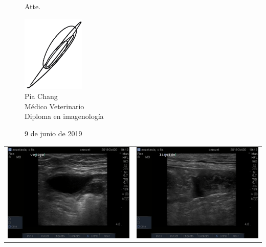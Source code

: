 \documentclass{article}
\begin{document}
\begin{figure}[h]
\noindent Atte.
  \begin{flushright}
\includegraphics[width=3cm]{./firma.jpg} \\
Pia Chang \\
Médico Veterinario \\
Diploma en imagenología
\end{flushright}
9 de junio de 2019
\end{figure}

\renewcommand{\arraystretch}{4}

\noindent\begin{tabularx}{\textwidth}{XR}
  \includegraphics[width=8.5cm,trim={85px 45px 45px 25px},clip]{./example/101204hs[0048131].jpg} & \includegraphics[width=8.5cm,trim={85px 45px 45px 25px},clip]{./example/101242hs[0048133].jpg} \\
\end{tabularx}
\end{document}
